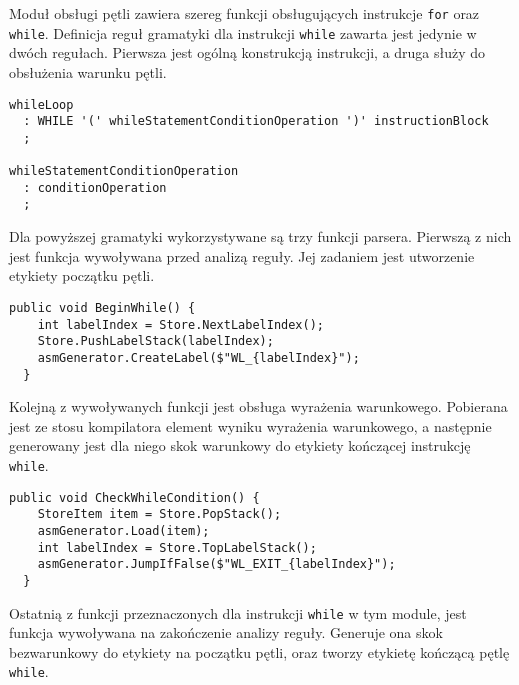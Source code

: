 Moduł obsługi pętli zawiera szereg funkcji obsługujących instrukcje \texttt{for} oraz \texttt{while}. Definicja reguł gramatyki dla instrukcji \texttt{while} zawarta jest jedynie w dwóch regułach. Pierwsza jest ogólną konstrukcją instrukcji, a druga służy do obsłużenia warunku pętli.

\begin{lstlisting}[language=IL, caption={Gramatyka dla instrukcji \texttt{while}}, label=alg:while1]
whileLoop
  : WHILE '(' whileStatementConditionOperation ')' instructionBlock
  ;

whileStatementConditionOperation
  : conditionOperation
  ;
\end{lstlisting}

\par Dla powyższej gramatyki wykorzystywane są trzy funkcji parsera. Pierwszą z nich jest funkcja wywoływana przed analizą reguły. Jej zadaniem jest utworzenie etykiety początku pętli.

\begin{lstlisting}[language=CSharp, caption={Implementacja funkcji obsługująca rozpoczęcie analizy instrukcji \texttt{while}}, label=alg:while2]
  public void BeginWhile() {
    int labelIndex = Store.NextLabelIndex();
    Store.PushLabelStack(labelIndex);
    asmGenerator.CreateLabel($"WL_{labelIndex}");
  }
\end{lstlisting}

\par Kolejną z wywoływanych funkcji jest obsługa wyrażenia warunkowego. Pobierana jest ze stosu kompilatora element wyniku wyrażenia warunkowego, a następnie generowany jest dla niego skok warunkowy do etykiety kończącej instrukcję \texttt{while}.

\begin{lstlisting}[language=CSharp, caption={Implementacja funkcji obsługująca wyrażenie warunkowe instrukcji \texttt{while}}, label=alg:while3]
  public void CheckWhileCondition() {
    StoreItem item = Store.PopStack();
    asmGenerator.Load(item);
    int labelIndex = Store.TopLabelStack();
    asmGenerator.JumpIfFalse($"WL_EXIT_{labelIndex}");
  }
\end{lstlisting}

\par Ostatnią z funkcji przeznaczonych dla instrukcji \texttt{while} w tym module, jest funkcja wywoływana na zakończenie analizy reguły. Generuje ona skok bezwarunkowy do etykiety na początku pętli, oraz tworzy etykietę kończącą pętlę \texttt{while}.

